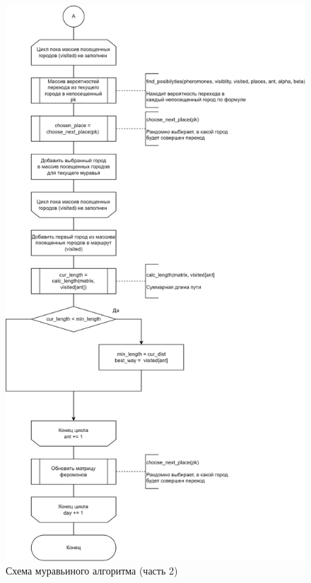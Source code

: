 \begin{figure}[h]
	\centering
	\includegraphics[height=0.9\textheight]{img/ants-2.png}
	\caption{Схема муравьиного алгоритма (часть 2)}
	\label{fig:ants-2}
\end{figure}

